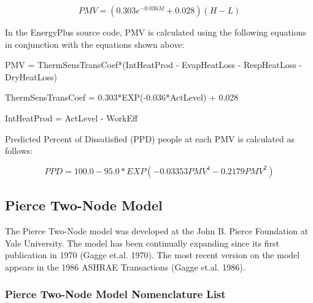 \begin{equation}
PMV = (0.303{e^{ - 0.036M}} + 0.028)(H - L)
\end{equation}

In the EnergyPlus source code, PMV is calculated using the following equations in conjunction with the equations shown above:

PMV = ThermSensTransCoef*(IntHeatProd - EvapHeatLoss - RespHeatLoss - DryHeatLoss)

ThermSensTransCoef = 0.303*EXP(-0.036*ActLevel) + 0.028

IntHeatProd = ActLevel - WorkEff

Predicted Percent of Dissatisfied (PPD) people at each PMV is calculated as follows:

\begin{equation}
PPD = 100.0 - 95.0*EXP(-0.03353{PMV^{4}} - 0.2179{PMV^{2}})
\end{equation}

\subsection{Pierce Two-Node Model}\label{pierce-two-node-model}

The Pierce Two-Node model was developed at the John B. Pierce Foundation at Yale University. The model has been continually expanding since its first publication in 1970 (Gagge et.al. 1970). The most recent version on the model appears in the 1986 ASHRAE Transactions (Gagge et.al. 1986).

\subsubsection{Pierce Two-Node Model Nomenclature List}\label{pierce-two-node-model-nomenclature-list}

